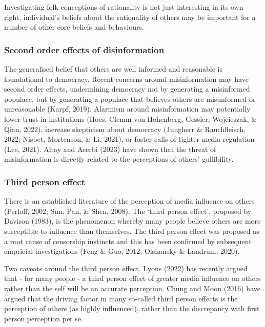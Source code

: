 \documentclass[
  ,jou,floatsintext]{apa6}
\begin{document}
Investigating folk conceptions of rationality is not just interesting in its own right, individual's beliefs about the rationality of others may be important for a number of other core beliefs and behaviours.

\hypertarget{second-order-effects-of-disinformation}{%
\subsubsection{Second order effects of disinformation}\label{second-order-effects-of-disinformation}}

The generalised belief that others are well informed and reasonable is foundational to democracy. Recent concerns around misinformation may have second order effects, undermining democracy not by generating a misinformed populace, but by generating a populace that believes others are misunformed or unreasonable (Karpf, 2019). Alarmism around misinformation may potentially lower trust in institutions (Hoes, Clemm von Hohenberg, Gessler, Wojcieszak, \& Qian, 2022), increase skepticism about democracy (Jungherr \& Rauchfleisch, 2022; Nisbet, Mortenson, \& Li, 2021), or foster calls of tighter media regulation (Lee, 2021). Altay and Acerbi (2023) have shown that the threat of misinformation is directly related to the perceptions of others' gullibility.

\hypertarget{third-person-effect}{%
\subsubsection{Third person effect}\label{third-person-effect}}

There is an established literature of the perception of media influence on others (Perloff, 2002; Sun, Pan, \& Shen, 2008). The `third person effect', proposed by Davison (1983), is the phenomenon whereby many people believe others are more susceptible to influence than themselves. The third person effect was proposed as a root cause of censorship instincts and this has been confirmed by subsequent empricial investigations (Feng \& Guo, 2012; Olshansky \& Landrum, 2020).

Two caveats around the third person effect. Lyons (2022) has recently argued that - for many people - a third person effect of greater media influence on others rather than the self will be an accurate perception. Chung and Moon (2016) have argued that the driving factor in many so-called third person effects is the perception of others (as highly influenced), rather than the discrepancy with first person perception per se.
\end{document}
